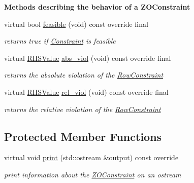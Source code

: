 \begin{Indent}\textbf{ Methods describing the behavior of a Z\+O\+Constraint}\par
\begin{DoxyCompactItemize}
\item 
virtual bool \mbox{\hyperlink{class_s_m_spp__di__unipi__it_1_1_z_o_constraint_a575ce9dd82d423f5d6e9699622935415}{feasible}} (void) const override final
\begin{DoxyCompactList}\small\item\em returns true if \mbox{\hyperlink{class_s_m_spp__di__unipi__it_1_1_constraint}{Constraint}} is feasible \end{DoxyCompactList}\item 
virtual \mbox{\hyperlink{class_s_m_spp__di__unipi__it_1_1_row_constraint_a8813536ab3b13a81c8e83a999ade3bd8}{R\+H\+S\+Value}} \mbox{\hyperlink{class_s_m_spp__di__unipi__it_1_1_z_o_constraint_a1e06e555eab5078e4d5ec16745778984}{abs\+\_\+viol}} (void) const override final
\begin{DoxyCompactList}\small\item\em returns the absolute violation of the \mbox{\hyperlink{class_s_m_spp__di__unipi__it_1_1_row_constraint}{Row\+Constraint}} \end{DoxyCompactList}\item 
virtual \mbox{\hyperlink{class_s_m_spp__di__unipi__it_1_1_row_constraint_a8813536ab3b13a81c8e83a999ade3bd8}{R\+H\+S\+Value}} \mbox{\hyperlink{class_s_m_spp__di__unipi__it_1_1_z_o_constraint_a44cb3a18055d2b46764d4eb21a0ff032}{rel\+\_\+viol}} (void) const override final
\begin{DoxyCompactList}\small\item\em returns the relative violation of the \mbox{\hyperlink{class_s_m_spp__di__unipi__it_1_1_row_constraint}{Row\+Constraint}} \end{DoxyCompactList}\end{DoxyCompactItemize}
\end{Indent}
\subsection*{Protected Member Functions}
\begin{DoxyCompactItemize}
\item 
\mbox{\label{class_s_m_spp__di__unipi__it_1_1_z_o_constraint_a59a9fcbf8f9f86d348344b2073644b0e}} 
virtual void \mbox{\hyperlink{class_s_m_spp__di__unipi__it_1_1_z_o_constraint_a59a9fcbf8f9f86d348344b2073644b0e}{print}} (std\+::ostream \&output) const override
\begin{DoxyCompactList}\small\item\em print information about the \mbox{\hyperlink{class_s_m_spp__di__unipi__it_1_1_z_o_constraint}{Z\+O\+Constraint}} on an ostream \end{DoxyCompactList}\end{DoxyCompactItemize}
